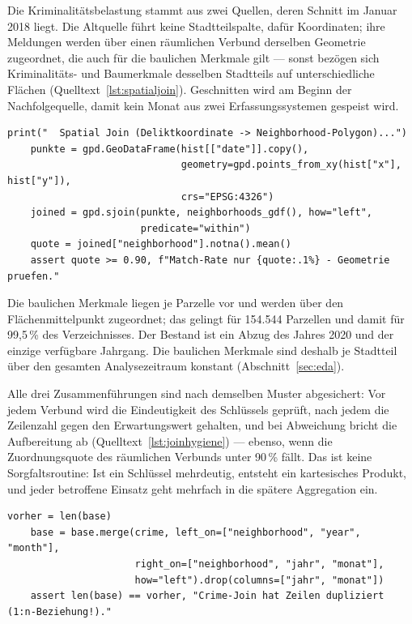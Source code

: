 Die Kriminalitätsbelastung stammt aus zwei Quellen, deren Schnitt im Januar
2018 liegt. Die Altquelle führt keine Stadtteilspalte, dafür Koordinaten; ihre
Meldungen werden über einen räumlichen Verbund derselben Geometrie zugeordnet,
die auch für die baulichen Merkmale gilt --- sonst bezögen sich Kriminalitäts-
und Baumerkmale desselben Stadtteils auf unterschiedliche Flächen
(Quelltext~\ref{lst:spatialjoin}). Geschnitten wird am Beginn der
Nachfolgequelle, damit kein Monat aus zwei Erfassungssystemen gespeist wird.

\begin{lstlisting}[style=pythonstil,
  label={lst:spatialjoin},
  caption={Räumlicher Verbund der Altquelle mit Abbruchschwelle
           (\texttt{prep/s1\_daten.py}, Z.~391--399)}]
    print("  Spatial Join (Deliktkoordinate -> Neighborhood-Polygon)...")
    punkte = gpd.GeoDataFrame(hist[["date"]].copy(),
                              geometry=gpd.points_from_xy(hist["x"], hist["y"]),
                              crs="EPSG:4326")
    joined = gpd.sjoin(punkte, neighborhoods_gdf(), how="left",
                       predicate="within")
    quote = joined["neighborhood"].notna().mean()
    assert quote >= 0.90, f"Match-Rate nur {quote:.1%} - Geometrie pruefen."
\end{lstlisting}

Die baulichen Merkmale liegen je Parzelle vor und werden über den
Flächenmittelpunkt zugeordnet; das gelingt für 154.544 Parzellen und damit für
99,5\,\% des Verzeichnisses. Der Bestand ist ein Abzug des Jahres 2020 und der
einzige verfügbare Jahrgang. Die baulichen Merkmale sind deshalb je Stadtteil
über den gesamten Analysezeitraum konstant (Abschnitt~\ref{sec:eda}).

Alle drei Zusammenführungen sind nach demselben Muster abgesichert: Vor jedem
Verbund wird die Eindeutigkeit des Schlüssels geprüft, nach jedem die Zeilenzahl
gegen den Erwartungswert gehalten, und bei Abweichung bricht die Aufbereitung
ab (Quelltext~\ref{lst:joinhygiene}) --- ebenso, wenn die Zuordnungsquote des
räumlichen Verbunds unter 90\,\% fällt. Das ist keine Sorgfaltsroutine: Ist ein
Schlüssel mehrdeutig, entsteht ein kartesisches Produkt, und jeder betroffene
Einsatz geht mehrfach in die spätere Aggregation ein.

\begin{lstlisting}[style=pythonstil,
  label={lst:joinhygiene},
  caption={Zeilenzahl vor und nach dem Verbund
           (\texttt{prep/s1\_daten.py}, Z.~643--647)}]
    vorher = len(base)
    base = base.merge(crime, left_on=["neighborhood", "year", "month"],
                      right_on=["neighborhood", "jahr", "monat"],
                      how="left").drop(columns=["jahr", "monat"])
    assert len(base) == vorher, "Crime-Join hat Zeilen dupliziert (1:n-Beziehung!)."
\end{lstlisting}


